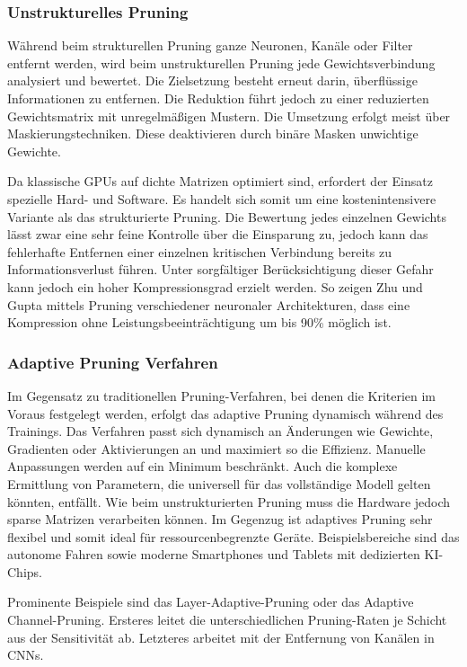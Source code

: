 \subsubsection{Unstrukturelles Pruning}

Während beim strukturellen Pruning ganze Neuronen, Kanäle oder Filter entfernt
werden, wird beim unstrukturellen Pruning jede Gewichtsverbindung analysiert
und bewertet. Die Zielsetzung besteht erneut darin, überflüssige Informationen
zu entfernen. Die Reduktion führt jedoch zu einer reduzierten Gewichtsmatrix
mit unregelmäßigen Mustern. Die Umsetzung erfolgt meist über
Maskierungstechniken. Diese deaktivieren durch binäre Masken unwichtige
Gewichte. \autocite[Vlg.][S. 3]{cheng2024survey}

Da klassische GPUs auf dichte Matrizen optimiert sind, erfordert der Einsatz
spezielle Hard- und Software. Es handelt sich somit um eine kostenintensivere
Variante als das strukturierte Pruning. Die Bewertung jedes einzelnen Gewichts
lässt zwar eine sehr feine Kontrolle über die Einsparung zu, jedoch kann das
fehlerhafte Entfernen einer einzelnen kritischen Verbindung bereits zu
Informationsverlust führen. Unter sorgfältiger Berücksichtigung dieser Gefahr
kann jedoch ein hoher Kompressionsgrad erzielt werden. So zeigen Zhu und Gupta
mittels Pruning verschiedener neuronaler Architekturen, dass eine Kompression
ohne Leistungsbeeinträchtigung um bis 90\% möglich ist.\autocites[Vgl.][S.3]{cheng2024survey}[S. 6-8]{zhu2022prune}

\subsubsection{Adaptive Pruning Verfahren}

Im Gegensatz zu traditionellen Pruning-Verfahren, bei denen die Kriterien im
Voraus festgelegt werden, erfolgt das adaptive Pruning dynamisch während des
Trainings. Das Verfahren passt sich dynamisch an Änderungen wie Gewichte,
Gradienten oder Aktivierungen an und maximiert so die Effizienz. Manuelle
Anpassungen werden auf ein Minimum beschränkt. Auch die komplexe Ermittlung
von Parametern, die universell für das vollständige Modell gelten könnten,
entfällt. Wie beim unstrukturierten Pruning muss die Hardware jedoch sparse
Matrizen verarbeiten können. Im Gegenzug ist adaptives Pruning sehr flexibel
und somit ideal für ressourcenbegrenzte Geräte. Beispielsbereiche sind das
autonome Fahren sowie moderne Smartphones und Tablets mit dedizierten KI-Chips.

Prominente Beispiele sind das Layer-Adaptive-Pruning oder das Adaptive
Channel-Pruning. Ersteres leitet die unterschiedlichen Pruning-Raten je Schicht
aus der Sensitivität ab. Letzteres arbeitet mit der Entfernung von Kanälen in
CNNs. \autocites[Vgl.][S. 295-296]{sakai2022structured}[S. 1-2]{wang2025adapt}


